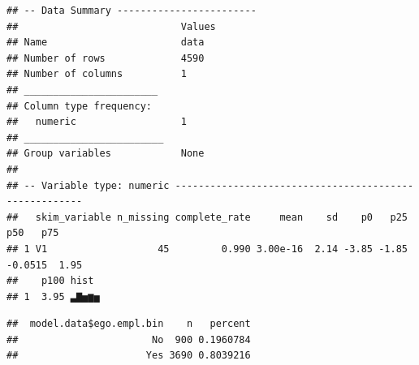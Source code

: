 \documentclass[
]{book}
\newenvironment{Shaded}{\begin{snugshade}}{\end{snugshade}}
\newcommand{\CommentTok}[1]{\textcolor[rgb]{0.56,0.35,0.01}{\textit{#1}}}
\newcommand{\DocumentationTok}[1]{\textcolor[rgb]{0.56,0.35,0.01}{\textbf{\textit{#1}}}}
\newcommand{\FunctionTok}[1]{\textcolor[rgb]{0.00,0.00,0.00}{#1}}
\newcommand{\NormalTok}[1]{#1}
\newcommand{\SpecialCharTok}[1]{\textcolor[rgb]{0.00,0.00,0.00}{#1}}
\begin{document}
\begin{Shaded}
\end{Shaded}

\begin{verbatim}
## -- Data Summary ------------------------
##                            Values
## Name                       data  
## Number of rows             4590  
## Number of columns          1     
## _______________________          
## Column type frequency:           
##   numeric                  1     
## ________________________         
## Group variables            None  
## 
## -- Variable type: numeric ------------------------------------------------------
##   skim_variable n_missing complete_rate     mean    sd    p0   p25     p50   p75
## 1 V1                   45         0.990 3.00e-16  2.14 -3.85 -1.85 -0.0515  1.95
##    p100 hist 
## 1  3.95 ▃▇▅▆▅
\end{verbatim}

\begin{Shaded}
\end{Shaded}

\begin{verbatim}
##  model.data$ego.empl.bin    n   percent
##                       No  900 0.1960784
##                      Yes 3690 0.8039216
\end{verbatim}

\begin{Shaded}
\end{Shaded}
\end{document}
